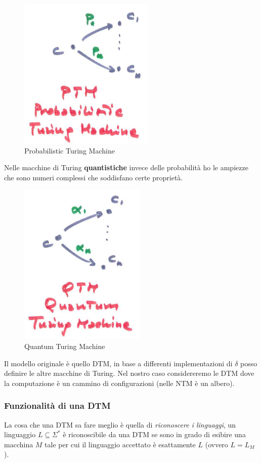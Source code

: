 \documentclass{article}
\begin{document}
\begin{figure}[H]
    \centering
    \includegraphics[scale=0.6]{images/PTM.png}
    \caption{Probabilistic Turing Machine}
\end{figure}
Nelle macchine di Turing \textbf{quantistiche} invece delle probabilità ho le ampiezze che sono
numeri complessi che soddisfano certe proprietà.
\begin{figure}[H]
    \centering
    \includegraphics[scale=0.6]{images/QTM.png}
    \caption{Quantum Turing Machine}
\end{figure}
Il modello originale è quello DTM, in base a differenti implementazioni di $\delta$ posso
definire le altre macchine di Turing. Nel nostro caso considereremo le DTM dove la computazione
è un cammino di configurazioni (nelle NTM è un albero).
\subsubsection{Funzionalità di una DTM}
La cosa che una DTM sa fare meglio è quella di \textit{riconoscere i linguaggi},
un linguaggio $L\subseteq\Sigma^*$ è riconoscibile da una DTM se sono in grado di
esibire una macchina $M$ tale per cui il linguaggio accettato è esattamente $L$ (ovvero $L=L_M$).
\end{document}
